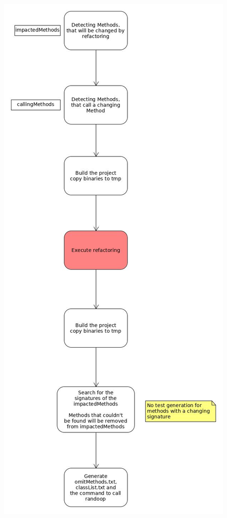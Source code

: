 \documentclass[accentcolor=tud9c, colorback]{tudreport}
\begin{document}
		\includegraphics[height=\textheight-100pt]{Ablaufdiagramm.jpg}
\end{document}

